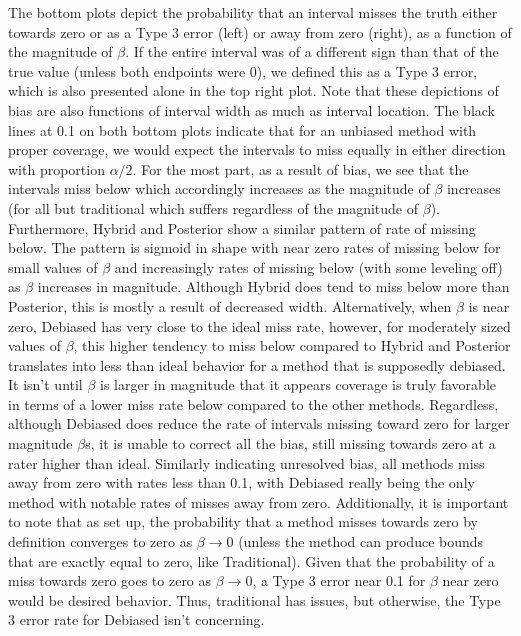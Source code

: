 The bottom plots depict the probability that an interval misses the truth either towards zero or as a Type 3 error (left) or away from zero (right), as a function of the magnitude of $\beta$. If the entire interval was of a different sign than that of the true value (unless both endpoints were 0), we defined this as a Type 3 error, which is also presented alone in the top right plot. Note that these depictions of bias are also functions of interval width as much as interval location.  The black lines at 0.1 on both bottom plots indicate that for an unbiased method with proper coverage, we would expect the intervals to miss equally in either direction with proportion $\alpha / 2$. For the most part, as a result of bias, we see that the intervals miss below which accordingly increases as the magnitude of $\beta$ increases (for all but traditional which suffers regardless of the magnitude of $\beta$). Furthermore, Hybrid and Posterior show a similar pattern of rate of missing below. The pattern is sigmoid in shape with near zero rates of missing below for small values of $\beta$ and increasingly rates of missing below (with some leveling off) as $\beta$ increases in magnitude. Although Hybrid does tend to miss below more than Posterior, this is mostly a result of decreased width. Alternatively, when $\beta$ is near zero, Debiased has very close to the ideal miss rate, however, for moderately sized values of $\beta$, this higher tendency to miss below compared to Hybrid and Posterior translates into less than ideal behavior for a method that is supposedly debiased. It isn't until $\beta$ is larger in magnitude that it appears coverage is truly favorable in terms of a lower miss rate below compared to the other methods. Regardless, although Debiased does reduce the rate of intervals missing toward zero for larger magnitude $\beta$s, it is unable to correct all the bias, still missing towards zero at a rater higher than ideal. Similarly indicating unresolved bias, all methods miss away from zero with rates less than 0.1, with Debiased really being the only method with notable rates of misses away from zero. Additionally, it is important to note that as set up, the probability that a method misses towards zero by definition converges to zero as $\beta \rightarrow 0$ (unless the method can produce bounds that are exactly equal to zero, like Traditional). Given that the probability of a miss towards zero goes to zero as $\beta \rightarrow 0$, a Type 3 error near 0.1 for $\beta$ near zero would be desired behavior. Thus, traditional has issues, but otherwise, the Type 3 error rate for Debiased isn't concerning.

